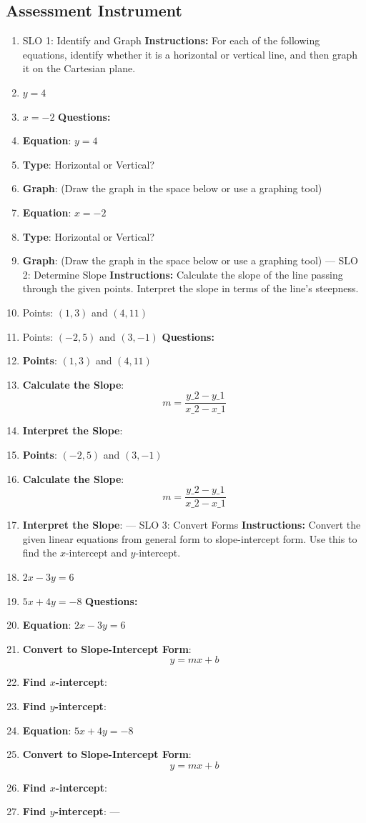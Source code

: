 \subsection{Assessment Instrument}

\begin{enumerate}
    \item SLO 1: Identify and Graph \textbf{Instructions:} For each of the following equations, identify whether it is a horizontal or vertical line, and then graph it on the Cartesian plane.
    \item $y = 4$
    \item $x = -2$ \textbf{Questions:}
    \item \textbf{Equation}: $y = 4$
    \item \textbf{Type}: Horizontal or Vertical?
    \item \textbf{Graph}: (Draw the graph in the space below or use a graphing tool)
    \item \textbf{Equation}: $x = -2$
    \item \textbf{Type}: Horizontal or Vertical?
    \item \textbf{Graph}: (Draw the graph in the space below or use a graphing tool) --- SLO 2: Determine Slope \textbf{Instructions:} Calculate the slope of the line passing through the given points. Interpret the slope in terms of the line's steepness.
    \item Points: $(1, 3)$ and $(4, 11)$
    \item Points: $(-2, 5)$ and $(3, -1)$ \textbf{Questions:}
    \item \textbf{Points}: $(1, 3)$ and $(4, 11)$
    \item \textbf{Calculate the Slope}: $$ m = \frac{y\_2 - y\_1}{x\_2 - x\_1} $$
    \item \textbf{Interpret the Slope}:
    \item \textbf{Points}: $(-2, 5)$ and $(3, -1)$
    \item \textbf{Calculate the Slope}: $$ m = \frac{y\_2 - y\_1}{x\_2 - x\_1} $$
    \item \textbf{Interpret the Slope}: --- SLO 3: Convert Forms \textbf{Instructions:} Convert the given linear equations from general form to slope-intercept form. Use this to find the $x$-intercept and $y$-intercept.
    \item $2x - 3y = 6$
    \item $5x + 4y = -8$ \textbf{Questions:}
    \item \textbf{Equation}: $2x - 3y = 6$
    \item \textbf{Convert to Slope-Intercept Form}: $$ y = mx + b $$
    \item \textbf{Find $x$-intercept}:
    \item \textbf{Find $y$-intercept}:
    \item \textbf{Equation}: $5x + 4y = -8$
    \item \textbf{Convert to Slope-Intercept Form}: $$ y = mx + b $$
    \item \textbf{Find $x$-intercept}:
    \item \textbf{Find $y$-intercept}: ---
\end{enumerate}

